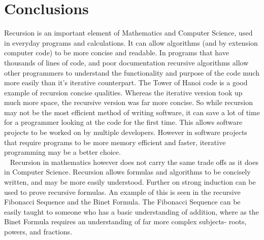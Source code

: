 \documentclass{article}
\begin{document}
\section{Conclusions}
Recursion is an important element of Mathematics and Computer Science, used in everyday programs and calculations.  It can allow algorithms (and by extension computer code) to be more concise and readable.  In programs that have thousands of lines of code, and poor documentation recursive algorithms allow other programmers to understand the functionality and purpose of the code much more easily than it's iterative counterpart.  The Tower of Hanoi code is a good example of recursion concise qualities.  Whereas the iterative version took up much more space, the recursive version was far more concise. So while recursion may not be the most efficient method of writing software, it can save a lot of time for a programmer looking at the code for the first time.  This allows software projects to be worked on by multiple developers.  However in software projects that require programs to be more memory efficient and faster, iterative programming may be a better choice.  \\~
Recursion in mathematics however does not carry the same trade offs as it does in Computer Science.  Recursion allows formulas and algorithms to be concisely written, and may be more easily understood.  Further on strong induction can be used to prove recursive formulas.  An example of this is seen in the recursive Fibonacci Sequence and the Binet Formula. The Fibonacci Sequence can be easily taught to someone who has a basic understanding of addition, where as the Binet Formula requires an understanding of far more complex subjects- roots, powers, and fractions.  

\begin{comment} Further on, it is not purely a mathematical construct, it has appearances in nature too.  Snowflake patterns, crystals, and leaf patterns contain fractals which are recursive patterns. If you put two mirrors parallel to each other, an infinite number of nested images are created.  This is an example of infinite recursion in nature. Although there are non recursive ways to implement otherwise Recursive formulas and/or programs, it is more inefficient to use the non recursive formula in certain cases, than it is to use the recursive, as evidenced by the Binet Formula and the Fibonacci Formula.\end{comment}
\end{document}
